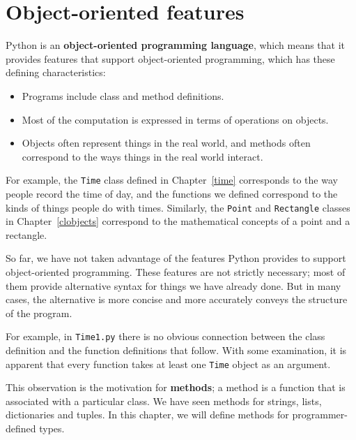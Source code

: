 \documentclass[10pt]{book}
\begin{document}
\section{Object-oriented features}

Python is an {\bf object-oriented programming language}, which means
that it provides features that support object-oriented
programming, which has these defining characteristics:

\begin{itemize}

\item Programs include class and method definitions.

\item Most of the computation is expressed in terms of operations on
  objects.

\item Objects often represent things
in the real world, and methods often
correspond to the ways things in the real world interact.

\end{itemize}

For example, the {\tt Time} class defined in Chapter~\ref{time}
corresponds to the way people record the time of day, and the
functions we defined correspond to the kinds of things people do with
times.  Similarly, the {\tt Point} and {\tt Rectangle} classes
in Chapter~\ref{clobjects}
correspond to the mathematical concepts of a point and a rectangle.

So far, we have not taken advantage of the features Python provides to
support object-oriented programming.  These
features are not strictly necessary; most of them provide
alternative syntax for things we have already done.  But in many cases,
the alternative is more concise and more accurately conveys the
structure of the program.

For example, in {\tt Time1.py} there is no obvious
connection between the class definition and the function definitions
that follow.  With some examination, it is apparent that every function
takes at least one {\tt Time} object as an argument.

This observation is the motivation for {\bf methods}; a method is
a function that is associated with a particular class.
We have seen methods for strings, lists, dictionaries and tuples.
In this chapter, we will define methods for programmer-defined types.
\end{document}
